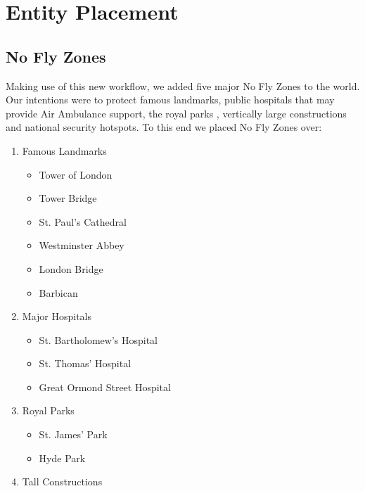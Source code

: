 \documentclass[a4paper,11pt,titlepage]{report}
\begin{document}
\clearpage
\section{Entity Placement}
\subsection{No Fly Zones}
Making use of this new workflow, we added five major No Fly Zones to the world. Our intentions were to protect famous landmarks, public hospitals that may provide Air Ambulance support, the royal parks \cite{Blunden2016}, vertically large constructions and national security hotspots. To this end we placed No Fly Zones over:
\begin{enumerate}
   \item Famous Landmarks
   \begin{multicols}{2}
     \begin{itemize}
       \item Tower of London
       \item Tower Bridge
       \item St. Paul's Cathedral
       \item Westminster Abbey
       \item London Bridge
       \item Barbican
     \end{itemize}
   \end{multicols}
   \item Major Hospitals
   \begin{multicols}{2}
     \begin{itemize}
       \item St. Bartholomew's Hospital
       \item St. Thomas' Hospital
       \item Great Ormond Street Hospital
     \end{itemize}
   \end{multicols}
   \item Royal Parks
   \begin{multicols}{2}
     \begin{itemize}
       \item St. James' Park
       \item Hyde Park
     \end{itemize}
   \end{multicols}
   \item Tall Constructions
   \begin{multicols}{2}
     \begin{itemize}

\end{itemize}
\end{multicols}
\end{enumerate}
\end{document}
